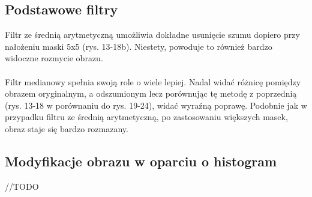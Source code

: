 \documentclass{classrep}
\begin{document}
\subsection{Podstawowe filtry}
Filtr ze średnią arytmetyczną umożliwia dokładne usunięcie szumu dopiero przy nałożeniu maski 5x5 (rys. 13-18b). Niestety, powoduje to również bardzo widoczne rozmycie obrazu.\\
\\
\indent
Filtr medianowy spełnia swoją role o wiele lepiej. Nadal widać różnicę pomiędzy obrazem oryginalnym, a odszumionym lecz porównując tę metodę z poprzednią (rys. 13-18 w porównaniu do rys. 19-24), widać wyraźną poprawę. Podobnie jak w przypadku filtru ze średnią arytmetyczną, po zastosowaniu większych masek, obraz staje się bardzo rozmazany.\\

\subsection{Modyfikacje obrazu w oparciu o histogram}
//TODO
\end{document}
